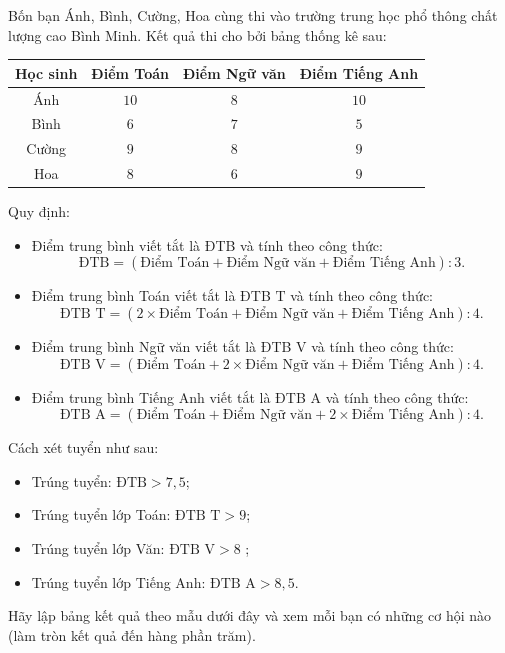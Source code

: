 \begin{bt}%
	Bốn bạn Ánh, Bình, Cường, Hoa cùng thi vào trường trung học phổ thông chất lượng cao Bình Minh. Kết quả thi cho bởi bảng thống kê sau$\colon$
	\begin{center}
		\begin{tabular}{|c|c|c|c|}
			\hline Học sinh & Điểm Toán & Điểm Ngữ văn & Điểm Tiếng Anh \\
			\hline Ánh & $10$ & $8$ & $10$ \\
			\hline Bình & $6$ & $7$ & $5$ \\
			\hline Cường & $9$ & $8$ & $9$ \\
			\hline Hoa & $8$ & $6$ & $9$ \\
			\hline
		\end{tabular}
	\end{center}
	Quy định$\colon$
	\begin{itemize}
		\item Điểm trung bình viết tắt là ĐTB và tính theo công thức$\colon$
		$$ \text{ĐTB} = (\text{Điểm Toán} + \text{Điểm Ngữ văn} + \text{Điểm Tiếng Anh}) \colon 3.$$
		\item Điểm trung bình Toán viết tắt là ĐTB $\mathrm{T}$ và tính theo công thức$\colon$
		$$ \text{ĐTB T}=(2 \times \text{Điểm Toán} + \text{Điểm Ngữ văn} + \text{Điểm Tiếng Anh})\colon 4.$$
		\item Điểm trung bình Ngữ văn viết tắt là ĐTB V và tính theo công thức$\colon$
		$$ \text{ĐTB V} = ( \text{Điểm Toán} +2 \times  \text{Điểm Ngữ văn} + \text{Điểm Tiếng Anh}) \colon 4.$$
		\item Điểm trung bình Tiếng Anh viết tắt là ĐTB A và tính theo công thức$\colon$
		$$ \text{ĐTB A}= (\text{Điểm Toán} + \text{Điểm Ngữ văn} +2 \times  \text{Điểm Tiếng Anh}) \colon4.$$
	\end{itemize}
	Cách xét tuyển như sau:
	\begin{itemize}
		\item Trúng tuyển: $\text{ĐTB}>7,5$;
		\item Trúng tuyển lớp Toán: $\text{ĐTB T}>9$;
		\item Trúng tuyển lớp Văn: $\text{ĐTB V} > 8$ ;
		\item Trúng tuyển lớp Tiếng Anh: $\text{ĐTB A}>8,5$.
	\end{itemize}
	Hãy lập bảng kết quả theo mẫu dưới đây và xem mỗi bạn có những cơ hội nào (làm tròn kết quả đến hàng phần trăm).
	\begin{center}

\end{center}
\end{bt}
